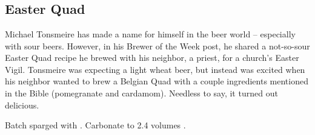 \part{\stylebelgiandarkstrongale}

\chapter*{Easter Quad}

\begin{aboutblock}
Michael Tonsmeire has made a name for himself in the beer world -- especially
with sour beers. However, in his Brewer of the Week post, he shared a not-so-sour
Easter Quad recipe he brewed with his neighbor, a priest, for a church's Easter Vigil.
Tonsmeire was expecting a light wheat beer, but instead was excited when his neighbor
wanted to brew a Belgian Quad with a couple ingredients mentioned in the Bible
(pomegranate and cardamom). Needless to say, it turned out delicious.
\end{aboutblock}


\begin{methodandtiming}
 
\begin{mashsteps}
\end{mashsteps}

\begin{fermentationsteps}
\end{fermentationsteps}

\begin{directions}
Batch sparged with . Carbonate to 2.4 volumes .
\end{directions}

\end{methodandtiming}

\pagebreak

\begin{ingredientsblock}

\begin{malts}
\end{malts}

\begin{hops}
\end{hops}

\begin{yeasts}
\end{yeasts}

\begin{twists}
\end{twists}

\end{ingredientsblock}

